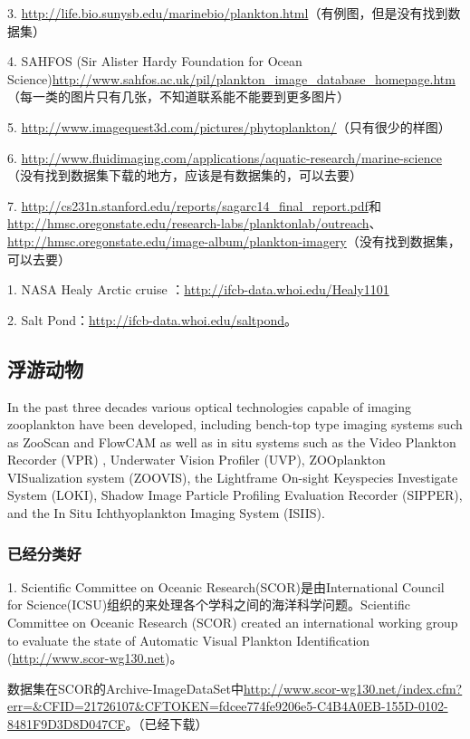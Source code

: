 3. \url{http://life.bio.sunysb.edu/marinebio/plankton.html}（有例图，但是没有找到数据集）

4. SAHFOS (Sir Alister Hardy Foundation for Ocean Science)\url{http://www.sahfos.ac.uk/pil/plankton_image_database_homepage.htm}（每一类的图片只有几张，不知道联系能不能要到更多图片）

5. \url{http://www.imagequest3d.com/pictures/phytoplankton/}（只有很少的样图）

6. \url{http://www.fluidimaging.com/applications/aquatic-research/marine-science}（没有找到数据集下载的地方，应该是有数据集的，可以去要）

7. \url{http://cs231n.stanford.edu/reports/sagarc14_final_report.pdf}和\url{http://hmsc.oregonstate.edu/research-labs/planktonlab/outreach}、\url{http://hmsc.oregonstate.edu/image-album/plankton-imagery}（没有找到数据集，可以去要）

1. NASA Healy Arctic cruise ：\url{http://ifcb-data.whoi.edu/Healy1101}

2. Salt Pond：\url{http://ifcb-data.whoi.edu/saltpond}。




\subsection{浮游动物}
In the past three decades various optical technologies capable of imaging zooplankton have been developed, including bench-top type imaging systems such as ZooScan and FlowCAM as well as in situ systems such as the Video Plankton Recorder (VPR) , Underwater Vision Profiler (UVP), ZOOplankton VISualization system (ZOOVIS), the Lightframe On-sight Keyspecies Investigate System (LOKI), Shadow Image Particle Profiling Evaluation Recorder (SIPPER), and the In Situ Ichthyoplankton Imaging System (ISIIS).

\subsubsection{已经分类好}
1. Scientific Committee on Oceanic Research(SCOR)是由International Council for Science(ICSU)组织的来处理各个学科之间的海洋科学问题。Scientific Committee on Oceanic Research (SCOR) created an international working group to evaluate the state of Automatic Visual Plankton Identification (\url{http://www.scor-wg130.net})\cite{gorsky2010digital}。

数据集在SCOR的Archive-ImageDataSet中\url{http://www.scor-wg130.net/index.cfm?err=&CFID=21726107&CFTOKEN=fdcee774fe9206e5-C4B4A0EB-155D-0102-8481F9D3D8D047CF}。（已经下载）


